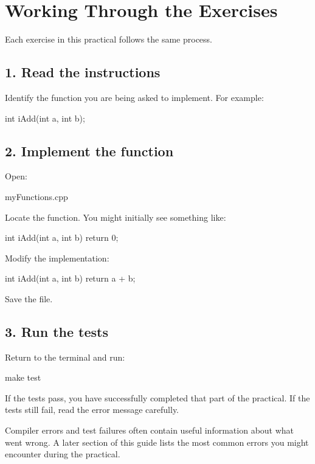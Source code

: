 \documentclass{csc2059practical}
\begin{document}
\section{Working Through the Exercises}

Each exercise in this practical follows the same process.

\subsection{1. Read the instructions}

Identify the function you are being asked to implement. For example:

\begin{cppcode}
int iAdd(int a, int b);
\end{cppcode}

\subsection{2. Implement the function}

Open:

\begin{terminal}
myFunctions.cpp
\end{terminal}

Locate the function. You might initially see something like:

\begin{cppcode}
int iAdd(int a, int b)
{
    return 0;
}
\end{cppcode}

Modify the implementation:

\begin{cppcode}
int iAdd(int a, int b)
{
    return a + b;
}
\end{cppcode}

Save the file.

\subsection{3. Run the tests}

Return to the terminal and run:

\begin{bashcode}
make test
\end{bashcode}

If the tests pass, you have successfully completed that part of the practical. If the tests still fail, read the error message carefully.

Compiler errors and test failures often contain useful information about what went wrong. A later section of this guide lists the most common errors you might encounter during the practical.
\end{document}
